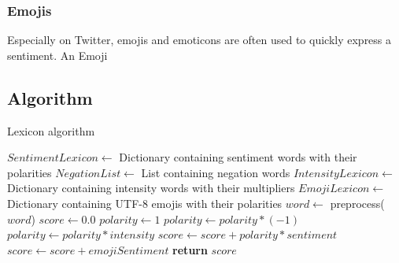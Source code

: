 
\subsubsection{Emojis}
Especially on Twitter, emojis and emoticons are often used to quickly express a sentiment. An Emoji



\subsection{Algorithm}




\begin{algorithm}[H]
  \caption{Lexicon algorithm}\label{euclid}
    \begin{algorithmic}[1]
            \State $SentimentLexicon \gets$ Dictionary containing sentiment words with their polarities
            \State $NegationList \gets$ List containing negation words
            \State $IntensityLexicon \gets$ Dictionary containing intensity words with their multipliers
            \State $EmojiLexicon \gets$ Dictionary containing UTF-8 emojis with their polarities
                \State $word \gets$ preprocess($word$)
                \State $score \gets 0.0$
                    \State $polarity \gets 1$
                            \State $polarity \gets polarity * (-1)$
                        \Else
                                \State $polarity \gets polarity * intensity$
                            \EndIf
                        \EndIf
                    \EndFor
                    \State $score \gets score + polarity * sentiment$
                \Else
                        \State $score \gets score + emojiSentiment$
                    \EndIf
                \EndIf 
            \EndFor
            \State \textbf{return} $score$
        \EndProcedure
    \end{algorithmic}
\end{algorithm}





